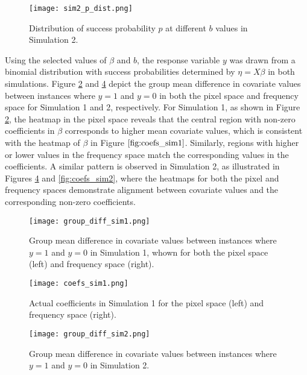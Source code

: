 \documentclass[12pt]{article}
\begin{document}
\begin{figure}[htbp] 
	\centering
	\texttt{[image: sim2\_p\_dist.png]} 
  \caption{Distribution of success probability \( p \) at different \( b \) values in Simulation 2.}
	\label{fig:sim2_p_dist} 
\end{figure}

Using the selected values of \( \beta \) and \( b \), the response variable \( y \) was drawn from a binomial distribution with
success probabilities determined by \( \eta = X \beta \) in both simulations. Figure \ref{fig:group_diff1} and
\ref{fig:group_diff2} depict the group mean difference in covariate values between instances where \( y = 1 \) and \( y = 0
\) in both the pixel space and frequency space for Simulation 1 and 2, respectively. For Simulation 1, as shown in Figure \ref{fig:group_diff1}, the heatmap in the pixel space reveals that the central
region with non-zero coefficients in \( \beta \) corresponds to higher mean covariate values, which is consistent with
the heatmap of \( \beta \) in Figure \( \ref{fig:coefs_sim1} \). Similarly, regions with higher or lower values in the
frequency space match the corresponding values in the coefficients. A similar pattern is observed in Simulation 2, as illustrated in Figures \ref{fig:group_diff2} and \ref{fig:coefs_sim2},
where the heatmaps for both the pixel and frequency spaces demonstrate alignment between covariate values and the
corresponding non-zero coefficients. 

\begin{figure}[htbp] 
	\centering
	\texttt{[image: group\_diff\_sim1.png]}
	\caption{Group mean difference in covariate values between instances where \( y = 1 \) and \( y = 0 \) in Simulation
  1, whown for both the pixel space (left) and frequency space (right).}
	\label{fig:group_diff1}
\end{figure}

\begin{figure}[htbp] 
	\centering
	\texttt{[image: coefs\_sim1.png]}
  \caption{Actual coefficients in Simulation 1 for the pixel space (left) and frequency space (right).}
  \label{fig:coefs_sim1}
\end{figure}

\begin{figure}[htbp] 
	\centering
	\texttt{[image: group\_diff\_sim2.png]}
	\caption{Group mean difference in covariate values between instances where \( y = 1 \) and \( y = 0 \) in Simulation 2.}
	\label{fig:group_diff2}
\end{figure}
\end{document}

